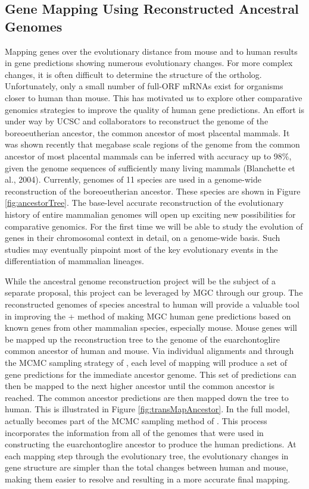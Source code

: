 \subsection*{Gene Mapping Using Reconstructed Ancestral Genomes}
Mapping genes over the evolutionary distance from mouse and to human
results in gene predictions showing numerous evolutionary changes.
For more complex changes, it is often difficult to determine the
structure of the ortholog. Unfortunately, only a small number of
full-ORF mRNAs exist for organisms closer to human than mouse. This
has motivated us to explore other comparative genomics strategies to
improve the quality of human gene predictions. An effort is under
way by UCSC and collaborators to reconstruct the genome of the
boreoeutherian ancestor, the common ancestor of most placental
mammals. It was shown recently that megabase scale regions of the
genome from the common ancestor of most placental mammals can be
inferred with accuracy up to 98\%, given the genome sequences of
sufficiently many living mammals (Blanchette et al., 2004).
Currently, genomes of 11 species are used in a genome-wide
reconstruction of the boreoeutherian ancestor. These species are
shown in Figure \ref{fig:ancestorTree}. The
base-level accurate reconstruction of the evolutionary history of
entire mammalian genomes will open up exciting new possibilities for
comparative genomics. For the first time we will be able to study
the evolution of genes in their chromosomal context in detail, on a
genome-wide basis. Such studies may eventually pinpoint most of the
key evolutionary events in the differentiation of mammalian
lineages.


While the ancestral genome reconstruction project will be the
subject of a separate proposal, this project can be leveraged by MGC
through our group. The reconstructed genomes of species ancestral to
human will provide a valuable tool in improving the \TransMap + \Ex
method of making MGC human gene predictions based on known genes
from other mammalian species, especially mouse. Mouse genes will be
mapped up the reconstruction tree to the genome of the
euarchontoglire common ancestor of human and mouse. Via individual
\TransMap alignments and through the MCMC sampling strategy of \Ex, each level
of mapping will produce a set of gene predictions for the immediate
ancestor genome. This set of predictions can then be mapped to the
next higher ancestor until the common ancestor is reached. The
common ancestor predictions are then mapped down the tree to human.
This is illustrated in Figure \ref{fig:transMapAncestor}. In the
full model, \TransMap actually becomes part of the MCMC
sampling method of \Ex. This process incorporates the information
from all of the genomes that were used in constructing the
euarchontoglire ancestor to produce the human predictions. At each
mapping step through the evolutionary tree, the evolutionary changes
in gene structure are simpler than the total changes between human
and mouse, making them easier to resolve and resulting in a more
accurate final mapping.



